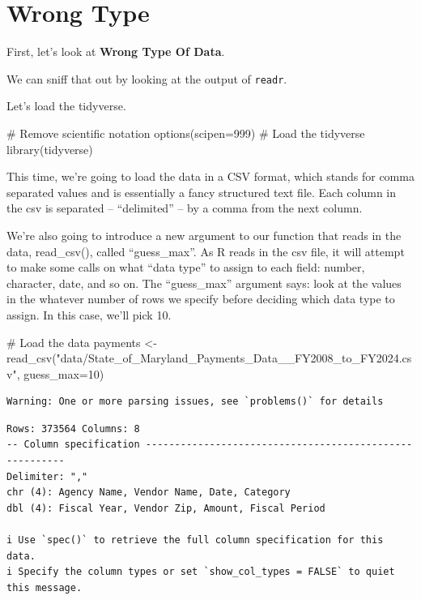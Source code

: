 \documentclass[
  letterpaper,
  DIV=11,
  numbers=noendperiod]{scrreprt}
\newenvironment{Shaded}{\begin{snugshade}}{\end{snugshade}}
\newcommand{\AttributeTok}[1]{\textcolor[rgb]{0.40,0.45,0.13}{#1}}
\newcommand{\CommentTok}[1]{\textcolor[rgb]{0.37,0.37,0.37}{#1}}
\newcommand{\DecValTok}[1]{\textcolor[rgb]{0.68,0.00,0.00}{#1}}
\newcommand{\FunctionTok}[1]{\textcolor[rgb]{0.28,0.35,0.67}{#1}}
\newcommand{\NormalTok}[1]{\textcolor[rgb]{0.00,0.23,0.31}{#1}}
\newcommand{\OtherTok}[1]{\textcolor[rgb]{0.00,0.23,0.31}{#1}}
\newcommand{\StringTok}[1]{\textcolor[rgb]{0.13,0.47,0.30}{#1}}
\begin{document}
\hypertarget{wrong-type}{%
\section{Wrong Type}\label{wrong-type}}

First, let's look at \textbf{Wrong Type Of Data}.

We can sniff that out by looking at the output of \texttt{readr}.

Let's load the tidyverse.

\begin{Shaded}
\begin{Highlighting}[]
\CommentTok{\# Remove scientific notation}
\FunctionTok{options}\NormalTok{(}\AttributeTok{scipen=}\DecValTok{999}\NormalTok{)}
\CommentTok{\# Load the tidyverse}
\FunctionTok{library}\NormalTok{(tidyverse)}
\end{Highlighting}
\end{Shaded}

This time, we're going to load the data in a CSV format, which stands
for comma separated values and is essentially a fancy structured text
file. Each column in the csv is separated -- ``delimited'' -- by a comma
from the next column.

We're also going to introduce a new argument to our function that reads
in the data, read\_csv(), called ``guess\_max''. As R reads in the csv
file, it will attempt to make some calls on what ``data type'' to assign
to each field: number, character, date, and so on. The ``guess\_max''
argument says: look at the values in the whatever number of rows we
specify before deciding which data type to assign. In this case, we'll
pick 10.

\begin{Shaded}
\begin{Highlighting}[]
\CommentTok{\# Load the data}
\NormalTok{payments }\OtherTok{\textless{}{-}} \FunctionTok{read\_csv}\NormalTok{(}\StringTok{"data/State\_of\_Maryland\_Payments\_Data\_\_FY2008\_to\_FY2024.csv"}\NormalTok{, }\AttributeTok{guess\_max=}\DecValTok{10}\NormalTok{)}
\end{Highlighting}
\end{Shaded}

\begin{verbatim}
Warning: One or more parsing issues, see `problems()` for details
\end{verbatim}

\begin{verbatim}
Rows: 373564 Columns: 8
-- Column specification --------------------------------------------------------
Delimiter: ","
chr (4): Agency Name, Vendor Name, Date, Category
dbl (4): Fiscal Year, Vendor Zip, Amount, Fiscal Period

i Use `spec()` to retrieve the full column specification for this data.
i Specify the column types or set `show_col_types = FALSE` to quiet this message.
\end{verbatim}
\end{document}

